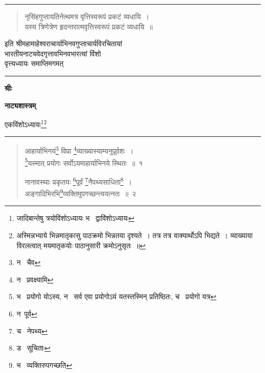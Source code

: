\documentclass[11pt, openany]{book}
\begin{document}
\hrule

\begin{quote}
{\qt नृसिंहगुप्तायतिनेत्थमत्र वृत्तिस्वरूपं प्रकटं व्यधायि~।\\
यस्य त्रिणेत्रेण हृदन्तरात्मवृत्तिस्वरूपं प्रकटं व्यधायि~॥}
\end{quote}

\begin{center}
इति श्रीमहामाहेश्वराचार्याभिनवगुप्ताचार्यविरचितायां\\

भारतीयनाट्यवेदगृत्तावभिनवभारत्यां विंशो\\

वृत्त्यध्यायः समाप्तिमगमत्\\

\vspace{2cm}
\rule{0.2\linewidth}{0.5pt}
\end{center}
 
\newpage
\thispagestyle{empty}

\begin{center}
\textbf{\large श्रीः}

\textbf{\LARGE नाट्यशास्त्रम्}

एकविंशोऽध्यायः\renewcommand{\thefootnote}{1}\footnote{जादिबान्तेषु त्रयोविंशोऽध्यायः भ \textendash\ द्वाविंशोऽध्यायः}\renewcommand{\thefootnote}{*}\footnote{अस्मिन्नभ्याये भिन्नमातृकासु पाठक्रमो भिन्नतया दृश्यते~। तत्र तत्र वाक्यार्थोऽपि भिद्यते~। व्याख्याया विरलत्वात् मयमातृकयोः पाठानुसारी क्रमोऽनुसृतः~॥}

\rule{0.2\linewidth}{0.5pt}
\end{center}

\begin{quote}
{\na आहार्याभिनयं\renewcommand{\thefootnote}{2}\footnote{न \textendash\ चैव} विप्रा \renewcommand{\thefootnote}{3}\footnote{न \textendash\ प्रवक्ष्यामि}व्याख्यास्याम्यनुपूर्वशः~।\\
\renewcommand{\thefootnote}{4}\footnote{भ \textendash\ प्रयोगो योऽस्य, न \textendash\ सर्व एवा प्रयोगोऽयं यतस्तस्मिन् प्रतिष्ठितः, च \textendash\ प्रयोगो यत्र}यस्मात् प्रयोगः सर्वोऽयमाहार्याभिनये स्थितः~॥~१

नानावस्थाः प्रकृतयः \renewcommand{\thefootnote}{5}\footnote{न\textendash\ पूर्व}पूर्वं \renewcommand{\thefootnote}{6}\footnote{च \textendash\ नेपथ्य}नैपथ्यसाधिता\renewcommand{\thefootnote}{7}\footnote{ड \textendash\ सूचिताः}~।\\
अङ्गादिभिरभि\renewcommand{\thefootnote}{8}\footnote{भ \textendash\ व्यक्तिरुपगच्छति}व्यक्तिमुपगच्छन्त्ययत्नतः~॥~२}
\end{quote}
\end{document}
